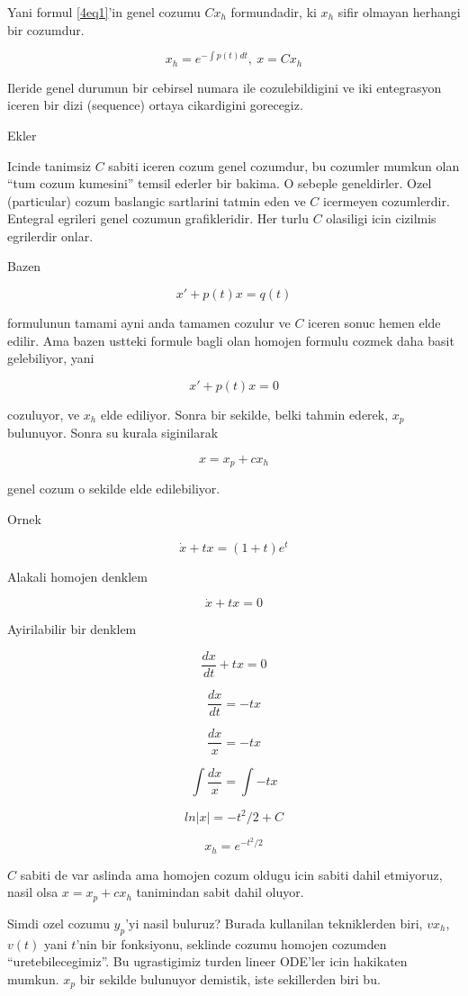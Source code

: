 \documentclass[12pt,fleqn]{article}\usepackage{../common}
\begin{document}
Yani formul \ref{4eq1}'in genel cozumu $C x_h$ formundadir, ki $x_h$ sifir
olmayan herhangi bir cozumdur.

\[ x_h = e^{- \int p(t) dt} , \ x = C x_h \]

Ileride genel durumun bir cebirsel numara ile cozulebildigini ve iki
entegrasyon iceren bir dizi (sequence) ortaya cikardigini gorecegiz. 

Ekler

Icinde tanimsiz $C$ sabiti iceren cozum genel cozumdur, bu cozumler mumkun
olan ``tum cozum kumesini'' temsil ederler bir bakima. O sebeple
geneldirler. Ozel (particular) cozum baslangic sartlarini tatmin eden ve
$C$ icermeyen cozumlerdir. Entegral egrileri genel cozumun
grafikleridir. Her turlu $C$ olasiligi icin cizilmis egrilerdir onlar.

Bazen 

\[ x' + p(t)x = q(t) \]
 
formulunun tamami ayni anda tamamen cozulur ve $C$ iceren sonuc hemen elde
edilir. Ama bazen ustteki formule bagli olan homojen formulu cozmek daha
basit gelebiliyor, yani

\[ x' + p(t)x = 0 \]
 
cozuluyor, ve $x_h$ elde ediliyor. Sonra bir sekilde, belki tahmin ederek,
$x_p$ bulunuyor. Sonra su kurala siginilarak 

\[ x = x_p + cx_h \]

genel cozum o sekilde elde edilebiliyor. 

Ornek

\[ \dot{x} + tx = (1+t)e^t \]

Alakali homojen denklem 

\[ \dot{x} + tx = 0\]

Ayirilabilir bir denklem

\[ \frac{dx}{dt} + tx = 0 \]

\[ \frac{dx}{dt} = - tx  \]

\[ \frac{dx}{x} = -tx \]

\[ \int \frac{dx}{x} = \int -tx \]

\[ ln |x| = -t^2 / 2 + C \]

\[ x_h = e^{-t^2/2} \]

$C$ sabiti de var aslinda ama homojen cozum oldugu icin sabiti dahil
etmiyoruz, nasil olsa $x = x_p + cx_h$ tanimindan sabit dahil oluyor.

Simdi ozel cozumu $y_p$'yi nasil buluruz? Burada kullanilan tekniklerden
biri, $vx_h$, $v(t)$ yani $t$'nin bir fonksiyonu, seklinde cozumu homojen
cozumden ``uretebilecegimiz''. Bu ugrastigimiz turden lineer ODE'ler icin
hakikaten mumkun. $x_p$ bir sekilde bulunuyor demistik, iste sekillerden
biri bu. 
\end{document}
